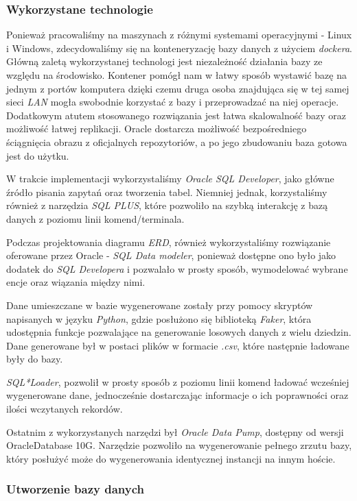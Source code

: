 \documentclass[a4paper]{article}
\begin{document}
\subsubsection{Wykorzystane technologie}

Ponieważ pracowaliśmy na maszynach z różnymi systemami operacyjnymi - Linux i Windows, zdecydowaliśmy się na konteneryzację bazy danych z użyciem\textit{ dockera}. Główną zaletą wykorzystanej technologi jest niezależność działania bazy ze względu na środowisko. Kontener pomógł nam w łatwy sposób wystawić bazę na jednym z portów komputera dzięki czemu druga osoba znajdująca się w tej samej sieci \textit{LAN} mogła swobodnie korzystać z bazy i przeprowadzać na niej operacje. Dodatkowym atutem stosowanego rozwiązania jest łatwa skalowalność bazy oraz możliwość łatwej replikacji. Oracle dostarcza możliwość bezpośredniego ściągnięcia obrazu z oficjalnych repozytoriów, a po jego zbudowaniu baza gotowa jest do użytku.

W trakcie implementacji wykorzystaliśmy \textit{Oracle SQL Developer}, jako główne źródło pisania zapytań oraz tworzenia tabel. Niemniej jednak, korzystaliśmy również z narzędzia \textit{SQL PLUS}, które pozwoliło na szybką interakcję z bazą danych z poziomu linii komend/terminala.

Podczas projektowania diagramu \textit{ERD}, również wykorzystaliśmy rozwiązanie oferowane przez Oracle - \textit{SQL Data modeler}, ponieważ dostępne ono było jako dodatek do \textit{SQL Developera} i pozwalało w prosty sposób, wymodelować wybrane encje oraz wiązania między nimi.

Dane umieszczane w bazie wygenerowane zostały przy pomocy skryptów napisanych w języku \textit{Python}, gdzie posłużono się biblioteką \textit{Faker}, która udostępnia funkcje pozwalające na generowanie losowych danych z wielu dziedzin. Dane generowane był w postaci plików w formacie \textit{.csv}, które następnie ładowane były do bazy.

\textit{SQL*Loader}, pozwolił w prosty sposób z poziomu linii komend ładować wcześniej wygenerowane dane, jednocześnie dostarczając informacje o ich poprawności oraz ilości wczytanych rekordów.

Ostatnim z wykorzystanych narzędzi był \textit{Oracle Data Pump}, dostępny od wersji Oracle\linebreak Database 10G. Narzędzie pozwoliło na wygenerowanie pełnego zrzutu bazy, który posłużyć może do wygenerowania identycznej instancji na innym hoście.

\subsubsection{Utworzenie bazy danych}
\end{document}
